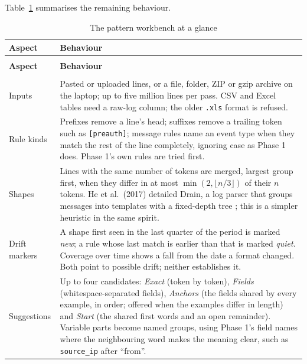 \documentclass[11pt,a4paper]{article}
\begin{document}
Table~\ref{tab:workbench} summarises the remaining behaviour.

\begingroup
\small
\begin{longtable}{>{\RaggedRight\arraybackslash}p{}>{\RaggedRight\arraybackslash}p{}}
\caption{The pattern workbench at a glance}\label{tab:workbench}\\
\toprule
\rowcolor{pale} \textbf{Aspect} & \textbf{Behaviour} \\
\midrule
\endfirsthead
\multicolumn{2}{l}{\small\itshape Table \thetable{} --- continued}\\
\toprule
\rowcolor{pale} \textbf{Aspect} & \textbf{Behaviour} \\
\midrule
\endhead
\midrule
\multicolumn{2}{r}{\footnotesize Continued on the next page}\\
\endfoot
\bottomrule
\endlastfoot
Inputs & Pasted or uploaded lines, or a file, folder, ZIP or gzip archive on the laptop; up to five million lines per pass. CSV and Excel tables need a raw-log column; the older \nolinkurl{.xls} format is refused. \\[3pt]
Rule kinds & Prefixes remove a line's head; suffixes remove a trailing token such as \nolinkurl{[preauth]}; message rules name an event type when they match the rest of the line completely, ignoring case as Phase 1 does. Phase 1's own rules are tried first. \\[3pt]
Shapes & Lines with the same number of tokens are merged, largest group first, when they differ in at most \(\min(2,\lfloor n/3\rfloor)\) of their \(n\) tokens. He et al.\ (2017) detailed Drain, a log parser that groups messages into templates with a fixed-depth tree \cite{ref11}; this is a simpler heuristic in the same spirit. \\[3pt]
Drift markers & A shape first seen in the last quarter of the period is marked \emph{new}; a rule whose last match is earlier than that is marked \emph{quiet}. Coverage over time shows a fall from the date a format changed. Both point to possible drift; neither establishes it. \\[3pt]
Suggestions & Up to four candidates: \emph{Exact} (token by token), \emph{Fields} (whitespace-separated fields), \emph{Anchors} (the fields shared by every example, in order; offered when the examples differ in length) and \emph{Start} (the shared first words and an open remainder). Variable parts become named groups, using Phase 1's field names where the neighbouring word makes the meaning clear, such as \nolinkurl{source_ip} after ``from''. \\[3pt]

\end{longtable}
\end{document}
